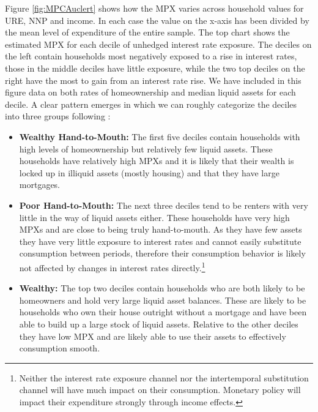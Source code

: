 \documentclass[titlepage]{\econtex}\newcommand{\texname}{ConsumptionHeterogeneity}
\begin{document}
Figure \ref{fig:MPCAuclert} shows how the MPX varies across household values for URE, NNP and income. In each case the value on the x-axis has been divided by the mean level of expenditure of the entire sample. The top chart shows the estimated MPX for each decile of unhedged interest rate exposure. The deciles on the left contain households most negatively exposed to a rise in interest rates, those in the middle deciles have little exposure, while the two top deciles on the right have the most to gain from an interest rate rise. We have included in this figure data on both rates of homeownership and median liquid assets for each decile. A clear pattern emerges in which we can roughly categorize the deciles into three groups following \cite{violante_wealthy_2014}:
\begin{itemize}
	\item \textbf{Wealthy Hand-to-Mouth:} The first five deciles contain households with high levels of homeownership but relatively few liquid assets. These households have relatively high MPXs and it is likely that their wealth is locked up in illiquid assets (mostly housing) and that they have large mortgages.
	\item \textbf{Poor Hand-to-Mouth:} The next three deciles tend to be renters with very little in the way of liquid assets either. These households have very high MPXs and are close to being truly hand-to-mouth. As they have few assets they have very little exposure to interest rates and cannot easily substitute consumption between periods, therefore their consumption behavior is likely not affected by changes in interest rates directly.\footnote{Neither the interest rate exposure channel nor the intertemporal substitution channel will have much impact on their consumption. Monetary policy will impact their expenditure strongly through income effects.}
	\item \textbf{Wealthy:} The top two deciles contain households who are both likely to be homeowners and hold very large liquid asset balances. These are likely to be households who own their house outright without a mortgage and have been able to build up a large stock of liquid assets. Relative to the other deciles they have low MPX and are likely able to use their assets to effectively consumption smooth.
\end{itemize}
\end{document}
